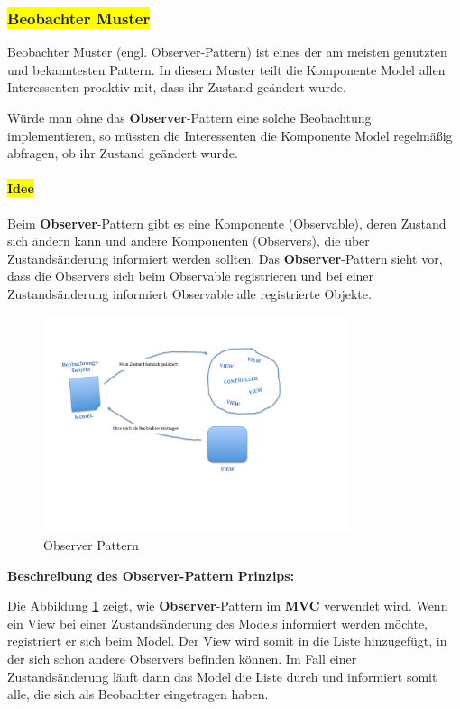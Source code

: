 \subsubsection{\colorbox{yellow}{Beobachter Muster}}\label{observer}

Beobachter Muster (engl. Observer-Pattern) ist eines der am meisten genutzten und bekanntesten Pattern. In diesem Muster teilt die Komponente Model allen Interessenten proaktiv mit, dass ihr Zustand geändert wurde.

Würde man ohne das \textbf{Observer}-Pattern eine solche Beobachtung implementieren, so müssten die Interessenten die Komponente Model regelmäßig abfragen, ob ihr Zustand geändert wurde.
\paragraph{\colorbox{yellow}{Idee}}
Beim \textbf{Observer}-Pattern gibt es eine Komponente (Observable), deren Zustand sich ändern kann und andere Komponenten (Observers), die über Zustandsänderung informiert werden sollten. Das \textbf{Observer}-Pattern sieht vor, dass die Observers sich beim Observable registrieren und bei einer Zustandsänderung informiert Observable alle registrierte Objekte.

\begin{figure}[H]
\centering
\includegraphics[trim = 0mm 0mm 0mm 0mm, clip, width=0.8\textwidth]{resources/observer}
\caption[Observer Pattern]{Observer Pattern}
\label{img:observer}
\end{figure}

\textbf{Beschreibung des \textbf{Observer}-Pattern Prinzips:}

Die Abbildung \ref{img:observer} zeigt, wie \textbf{Observer}-Pattern im \textbf{MVC} verwendet wird. Wenn ein View bei einer Zustandsänderung des Models informiert werden möchte, registriert er sich beim Model. Der View wird somit in die Liste hinzugefügt, in der sich schon andere Observers befinden können. Im Fall einer Zustandsänderung läuft dann das Model die Liste durch und informiert somit alle, die sich als Beobachter eingetragen haben.
